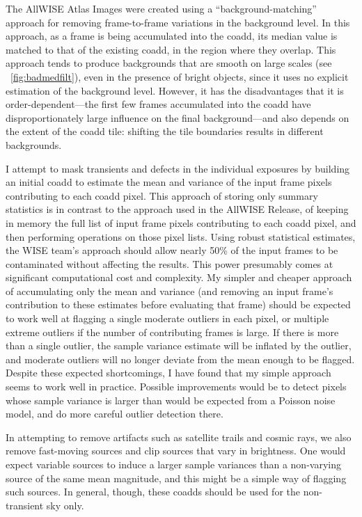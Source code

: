 \documentclass[11pt,preprint]{aastex}
\newcommand{\figref}[1]{\figurename~\ref{#1}}
\begin{document}
The AllWISE Atlas Images were created using a ``background-matching''
approach for removing frame-to-frame variations in the background
level.  In this approach, as a frame is being accumulated into the
coadd, its median value is matched to that of the existing coadd, in
the region where they overlap.  This approach tends to produce
backgrounds that are smooth on large scales (see
\figref{fig:badmedfilt}), even in the presence of bright objects,
since it uses no explicit estimation of the background level.
However, it has the disadvantages that it is order-dependent---the
first few frames accumulated into the coadd have disproportionately
large influence on the final background---and also depends on the
extent of the coadd tile: shifting the tile boundaries results in
different backgrounds.


I attempt to mask transients and defects in the individual exposures
by building an initial coadd to estimate the mean and variance of the
input frame pixels contributing to each coadd pixel.  This approach of
storing only summary statistics is in contrast to the approach used in
the AllWISE Release, of keeping in memory the full list of input frame
pixels contributing to each coadd pixel, and then performing
operations on those pixel lists.  Using robust statistical estimates,
the WISE team's approach should allow nearly 50\% of the input frames
to be contaminated without affecting the results.  This power
presumably comes at significant computational cost and complexity.
My simpler and cheaper approach of accumulating only the mean and
variance (and removing an input frame's contribution to these
estimates before evaluating that frame) should be expected to work
well at flagging a single moderate outliers in each pixel, or multiple
extreme outliers if the number of contributing frames is large.  If
there is more than a single outlier, the sample variance estimate will
be inflated by the outlier, and moderate outliers will no longer
deviate from the mean enough to be flagged.  Despite these expected
shortcomings, I have found that my simple approach seems to work
well in practice.  Possible improvements would be to detect pixels
whose sample variance is larger than would be expected from a Poisson
noise model, and do more careful outlier detection there.


In attempting to remove artifacts such as satellite trails and cosmic
rays, we also remove fast-moving sources and clip sources that vary in
brightness.  One would expect variable sources to induce a larger
sample variances than a non-varying source of the same mean magnitude,
and this might be a simple way of flagging such sources.  In general,
though, these coadds should be used for the non-transient sky only.
\end{document}
